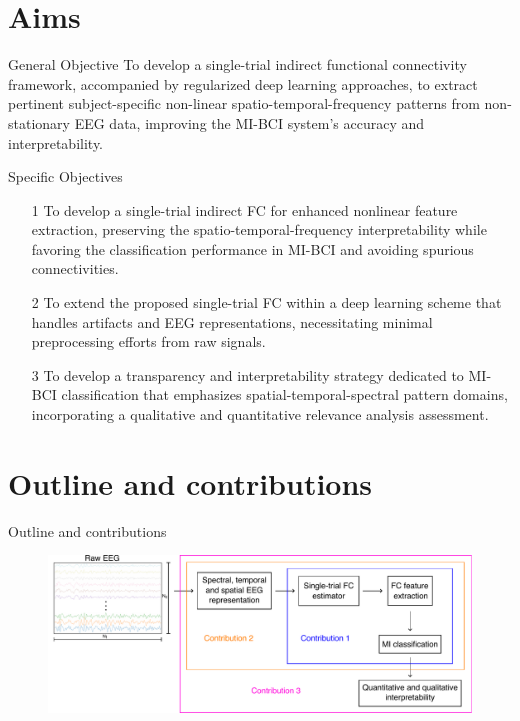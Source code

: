 \documentclass[aspectratio=169]{beamer}
\begin{document}
\section{Aims}

\begin{frame}{General Objective}
    To develop a single-trial indirect functional connectivity framework, accompanied by regularized deep learning approaches, to extract pertinent subject-specific non-linear spatio-temporal-frequency patterns from non-stationary EEG data, improving the MI-BCI system's accuracy and interpretability.
\end{frame}

\begin{frame}{Specific Objectives}
\centering
\begin{itemize}
    \setlength\itemsep{2em}
	\item[1] To develop a single-trial indirect FC for enhanced nonlinear feature extraction, preserving the spatio-temporal-frequency interpretability while favoring the classification performance in MI-BCI and avoiding spurious connectivities.
 
	\item[2] To extend the proposed single-trial FC within a deep learning scheme that handles artifacts and EEG representations, necessitating minimal preprocessing efforts from raw signals.
 
	\item[3] To develop a transparency and interpretability strategy dedicated to MI-BCI classification that emphasizes spatial-temporal-spectral pattern domains, incorporating a qualitative and quantitative relevance analysis assessment.
\end{itemize}
\end{frame}

\section{Outline and contributions}

\begin{frame}{Outline and contributions}
    \begin{figure}[h!]
        \centering
        \includegraphics[scale=0.65]{../Tesis_document/Figures/outline_and_contributions/general_contributions.pdf}
    \end{figure}
\end{frame}
\end{document}
